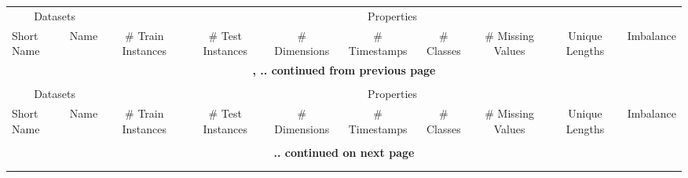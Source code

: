 {\tiny
	\begin{longtable}{|ll|cccccccc|}

		\hline
		\multicolumn{2}{|c}{Datasets} & \multicolumn{8}{|c|}{Properties} \\
		Short Name & Name & \# Train Instances & \# Test Instances & \# Dimensions & \# Timestamps & \# Classes & \# Missing Values & Unique Lengths & Imbalance \\
		\hline
		\endfirsthead

		\multicolumn{10}{c}{\bfseries \tablename \thetable{}, .. continued from previous page} \\
		\multicolumn{10}{c}{} \\
		\hline
		\multicolumn{2}{|c}{Datasets} & \multicolumn{8}{|c|}{Properties} \\
		Short Name & Name & \# Train Instances & \# Test Instances & \# Dimensions & \# Timestamps & \# Classes & \# Missing Values & Unique Lengths & Imbalance \\
		\hline
		\endhead

		\multicolumn{10}{c}{} \\
		\multicolumn{10}{c}{\bfseries  .. continued on next page} \\
		\endfoot

		\multicolumn{10}{c}{} \\
		\endlastfoot


\end{longtable}}
